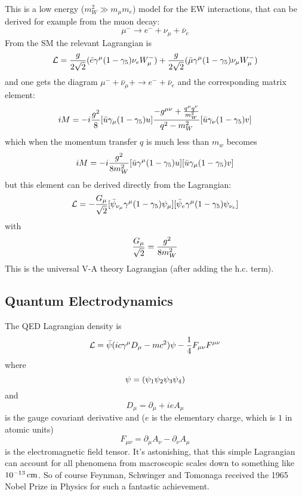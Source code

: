 This is a low energy ($m_W^2 \gg m_\mu m_e$) model for the EW interactions, that can be derived for example from the muon decay: 
\begin{equation*}
  \mu^- \to e^- +\nu_\mu + \bar \nu_e
\end{equation*}
From the SM the relevant Lagrangian is 
\begin{equation*}
  {\mathcal L} = {g\over2\sqrt2}(\bar e \gamma^\mu (1-\gamma_5) \nu_e W^-_\mu) + {g\over2\sqrt2}(\bar \mu \gamma^\mu (1-\gamma_5) \nu_\mu W^-_\mu)
\end{equation*}
and one gets the diagram $\mu^- +\bar\nu_\mu+ \to e^- + \bar \nu_e$ and the corresponding matrix element: 
\begin{equation*}
  iM = -i{g^2\over8}[\bar u\gamma_\mu (1-\gamma_5) u] {-g^{\mu\nu}+{q^\mu q^\nu\over m_W^2}\over q^2 - m_W^2} [\bar u\gamma_\nu (1-\gamma_5) v]
\end{equation*}
which when the momentum transfer $q$ is much less than $m_w$ becomes 
\begin{equation*}
  iM = -i{g^2\over8m_W^2}[\bar u\gamma^\mu (1-\gamma_5) u] [\bar u\gamma_\mu (1-\gamma_5) v]
\end{equation*}
but this element can be derived directly from the Lagrangian: 
\begin{equation*}
  {\mathcal L} = -{G_\mu\over\sqrt2} [\bar \psi_{\nu_\mu}\gamma^\mu (1-\gamma_5) \psi_\mu] [\bar \psi_e\gamma^\mu (1-\gamma_5) \psi_{\nu_e}]
\end{equation*}
with 
\begin{equation*}
  {G_\mu\over\sqrt2} = {g^2\over8m_W^2}
\end{equation*}
This is the universal V-A theory Lagrangian (after adding the h.c. term).

\subsection{Quantum Electrodynamics}

The QED Lagrangian density is 
\begin{equation*}
  {\mathcal L}=\bar\psi(ic\gamma^\mu D_\mu-mc^2)\psi-{1\over4}F_{\mu\nu}F^{\mu\nu}
\end{equation*}
where 
\begin{equation*}
  \psi=\left({\psi_1\psi_2\psi_3\psi_4}\right)
\end{equation*}
and 
\begin{equation*}
  D_\mu=\partial_\mu+ieA_\mu
\end{equation*}
is the gauge covariant derivative and ($e$ is the elementary charge, which is $1$ in atomic units) 
\begin{equation*}
  F_{\mu\nu}=\partial_\mu A_\nu-\partial_\nu A_\mu
\end{equation*}
is the electromagnetic field tensor. It's astonishing, that this simple Lagrangian can account for all phenomena from macroscopic scales down to something like $10^{-13}\rm\,cm$. So of course Feynman, Schwinger and Tomonaga received the 1965 Nobel Prize in Physics for such a fantastic achievement.

